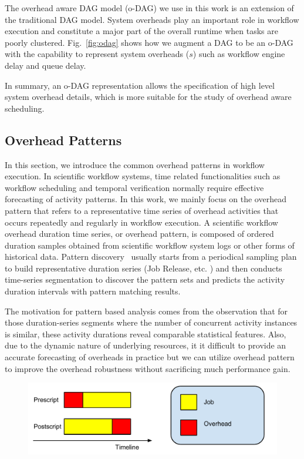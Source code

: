 \documentclass[final]{IEEEtran}
\begin{document}
The overhead aware DAG model (o-DAG) we use in this work is an extension of the traditional DAG model. System overheads play an important role in workflow execution and constitute a major part of the overall runtime when tasks are poorly clustered. Fig.~\ref{fig:odag} shows how we augment a DAG to be an o-DAG with the capability to represent system overheads ($s$) such as workflow engine delay and queue delay. 


In summary, an o-DAG representation allows the specification of high level system overhead details, which is more suitable for the study of overhead aware scheduling. 


\subsection{Overhead Patterns}

In this section, we introduce the common overhead patterns in workflow execution. 
In scientific workflow systems, time related functionalities such as workflow scheduling and temporal verification normally require effective forecasting of activity patterns. In this work, we mainly focus on the overhead pattern that refers to a representative time series of overhead activities that occurs repeatedly and regularly in workflow execution. A scientific workflow overhead duration time series, or overhead pattern, is composed of ordered duration samples obtained from scientific workflow system logs or other forms of historical data. 
Pattern discovery~\cite{Liu2008} usually starts from a periodical sampling plan to build representative duration series (Job Release, etc. ) and then conducts time-series segmentation to discover the pattern sets and predicts the activity duration intervals with pattern matching results. 


The motivation for pattern based analysis comes from the observation that for those duration-series segments where the number of concurrent activity instances is similar, these activity durations reveal comparable statistical features. Also, due to the dynamic nature of underlying resources, it it difficult to provide an accurate forecasting of overheads in practice but we can utilize overhead pattern to improve the overhead robustness without sacrificing much performance gain. 

\begin{figure}[htb]
\centering
 \includegraphics[width=1\linewidth]{figure/adherence.pdf}
  \label{fig:adhere}
  \vspace{-10pt}
\end{figure}
\end{document}
